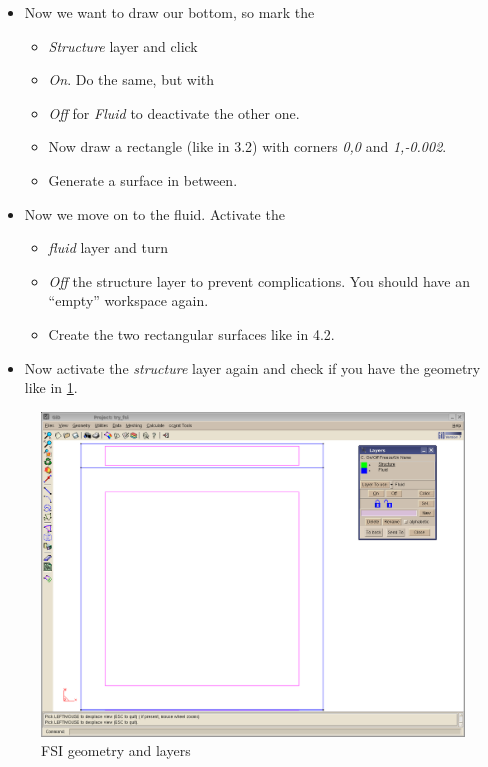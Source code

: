 \begin{itemize}
\item Now we want to draw our bottom, so mark the \emph{}

\begin{itemize}
\item \emph{Structure} layer and click
\item \emph{On}. Do the same, but with \emph{}
\item \emph{Off} for \emph{Fluid} to deactivate the other one. 
\item Now draw a rectangle (like in 3.2) with corners \emph{0,0} and \emph{1,-0.002}. 
\item Generate a surface in between.
\end{itemize}
\item Now we move on to the fluid. Activate the \emph{}

\begin{itemize}
\item \emph{fluid} layer and turn 
\item \emph{Off} the structure layer to prevent complications. You should
have an {}``empty'' workspace again. 
\item Create the two rectangular surfaces like in 4.2.
\end{itemize}
\item Now activate the \emph{structure} layer again and check if you have
the geometry like in \ref{tut_fsi:5.2}.
\end{itemize}
%
\begin{figure}[h]
\includegraphics[scale=0.4]{Bilder/fsi_02}


\caption{\label{tut_fsi:5.2} FSI geometry and layers}
\end{figure}


